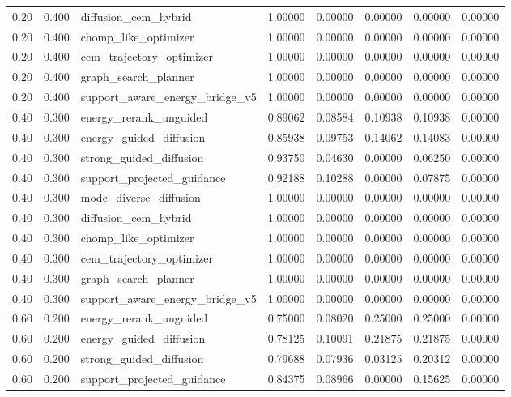 \documentclass{article}
\begin{document}
\begin{table}[tbp]
{\begin{tabular}{llllllll}
0.20 & 0.400 & diffusion\_cem\_hybrid & 1.00000 & 0.00000 & 0.00000 & 0.00000 & 0.00000 \\
0.20 & 0.400 & chomp\_like\_optimizer & 1.00000 & 0.00000 & 0.00000 & 0.00000 & 0.00000 \\
0.20 & 0.400 & cem\_trajectory\_optimizer & 1.00000 & 0.00000 & 0.00000 & 0.00000 & 0.00000 \\
0.20 & 0.400 & graph\_search\_planner & 1.00000 & 0.00000 & 0.00000 & 0.00000 & 0.00000 \\
0.20 & 0.400 & support\_aware\_energy\_bridge\_v5 & 1.00000 & 0.00000 & 0.00000 & 0.00000 & 0.00000 \\
0.40 & 0.300 & energy\_rerank\_unguided & 0.89062 & 0.08584 & 0.10938 & 0.10938 & 0.00000 \\
0.40 & 0.300 & energy\_guided\_diffusion & 0.85938 & 0.09753 & 0.14062 & 0.14083 & 0.00000 \\
0.40 & 0.300 & strong\_guided\_diffusion & 0.93750 & 0.04630 & 0.00000 & 0.06250 & 0.00000 \\
0.40 & 0.300 & support\_projected\_guidance & 0.92188 & 0.10288 & 0.00000 & 0.07875 & 0.00000 \\
0.40 & 0.300 & mode\_diverse\_diffusion & 1.00000 & 0.00000 & 0.00000 & 0.00000 & 0.00000 \\
0.40 & 0.300 & diffusion\_cem\_hybrid & 1.00000 & 0.00000 & 0.00000 & 0.00000 & 0.00000 \\
0.40 & 0.300 & chomp\_like\_optimizer & 1.00000 & 0.00000 & 0.00000 & 0.00000 & 0.00000 \\
0.40 & 0.300 & cem\_trajectory\_optimizer & 1.00000 & 0.00000 & 0.00000 & 0.00000 & 0.00000 \\
0.40 & 0.300 & graph\_search\_planner & 1.00000 & 0.00000 & 0.00000 & 0.00000 & 0.00000 \\
0.40 & 0.300 & support\_aware\_energy\_bridge\_v5 & 1.00000 & 0.00000 & 0.00000 & 0.00000 & 0.00000 \\
0.60 & 0.200 & energy\_rerank\_unguided & 0.75000 & 0.08020 & 0.25000 & 0.25000 & 0.00000 \\
0.60 & 0.200 & energy\_guided\_diffusion & 0.78125 & 0.10091 & 0.21875 & 0.21875 & 0.00000 \\
0.60 & 0.200 & strong\_guided\_diffusion & 0.79688 & 0.07936 & 0.03125 & 0.20312 & 0.00000 \\
0.60 & 0.200 & support\_projected\_guidance & 0.84375 & 0.08966 & 0.00000 & 0.15625 & 0.00000 \\
\bottomrule
\end{tabular}
}
\end{table}
\end{document}
